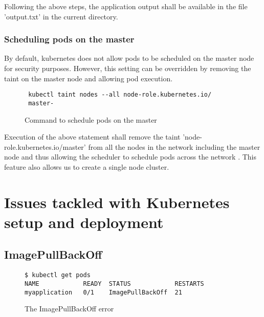 \documentclass[9pt,twocolumn,twoside]{../../styles/osajnl}
\begin{document}
Following the above steps, the application output shall be available
in the file 'output.txt' in the current directory.


\subsubsection{Scheduling pods on the master}
By default, kubernetes does not allow pods to be
scheduled on the master node for security purposes. However, this
setting can be overridden by removing the taint on the master node and
allowing pod execution.
\begin{figure}[H]
\begin{verbatim}
 kubectl taint nodes --all node-role.kubernetes.io/
 master-
\end{verbatim}
\caption{Command to schedule pods on the master}
\vspace{-4mm}
\label{Command to schedule pods on the master}
\end{figure}

Execution of the above statement shall remove the taint
'node-role.kubernetes.io/master' from all the nodes in the network
including the master node and thus allowing the scheduler to schedule
pods across the network \cite{www-kubernetes-kubeadm}. This feature
also allows us to create a single node cluster.

\section{Issues tackled with Kubernetes setup and deployment}

\subsection{ImagePullBackOff}

\begin{figure}[H]
\begin{verbatim}
$ kubectl get pods
NAME            READY  STATUS            RESTARTS  
myapplication   0/1    ImagePullBackOff  21         
\end{verbatim}
\caption{The ImagePullBackOff error}
\vspace{-3mm}
\label{The ImagePullBackOff error}
\end{figure}
\end{document}
